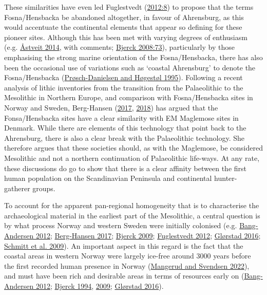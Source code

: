 \documentclass[
  12pt,
  a4paper,
  oneside]{book}
\begin{document}
These similarities have even led Fuglestvedt (\protect\hyperlink{ref-fuglestvedt2012}{2012:8}) to propose that the terms Fosna/Hensbacka be abandoned altogether, in favour of Ahrensburg, as this would accentuate the continental elements that appear so defining for these pioneer sites. Although this has been met with varying degrees of enthusiasm (e.g. \protect\hyperlink{ref-uxe5stveit2014}{Åstveit 2014}, with comments; \protect\hyperlink{ref-bjerck2008}{Bjerck 2008:73}), particularly by those emphasising the strong marine orientation of the Fosna/Hensbacka, there has also been the occasional use of variations such as `coastal Ahrensburg' to denote the Fosna/Hensbacka (\protect\hyperlink{ref-pruxf8sch-danielsen1995}{Prøsch-Danielsen and Høgestøl 1995}). Following a recent analysis of lithic inventories from the transition from the Palaeolithic to the Mesolithic in Northern Europe, and comparison with Fosna/Hensbacka sites in Norway and Sweden, Berg-Hansen (\protect\hyperlink{ref-berg-hansen2017}{2017}, \protect\hyperlink{ref-berg-hansen2018}{2018}) has argued that the Fonsa/Hensbacka sites have a clear similarity with EM Maglemose sites in Denmark. While there are elements of this technology that point back to the Ahrensburg, there is also a clear break with the Palaeolithic technology. She therefore argues that these societies should, as with the Maglemose, be considered Mesolithic and not a northern continuation of Palaeolithic life-ways. At any rate, these discussions do go to show that there is a clear affinity between the first human population on the Scandinavian Peninsula and continental hunter-gatherer groups.

To account for the apparent pan-regional homogeneity that is to characterise the archaeological material in the earliest part of the Mesolithic, a central question is by what process Norway and western Sweden were initially colonised (e.g. \protect\hyperlink{ref-bang-andersen2012}{Bang-Andersen 2012}; \protect\hyperlink{ref-berg-hansen2017}{Berg-Hansen 2017}; \protect\hyperlink{ref-bjerck2009}{Bjerck 2009}; \protect\hyperlink{ref-fuglestvedt2012}{Fuglestvedt 2012}; \protect\hyperlink{ref-glorstad2016}{Glørstad 2016}; \protect\hyperlink{ref-schmitt2009}{Schmitt et al. 2009}). An important aspect in this regard is the fact that the coastal areas in western Norway were largely ice-free around 3000 years before the first recorded human presence in Norway (\protect\hyperlink{ref-mangerud2022}{Mangerud and Svendsen 2022}), and must have been rich and desirable areas in terms of resources early on (\protect\hyperlink{ref-bang-andersen2012}{Bang-Andersen 2012}; \protect\hyperlink{ref-bjerck1994}{Bjerck 1994}, \protect\hyperlink{ref-bjerck2009}{2009}; \protect\hyperlink{ref-glorstad2016}{Glørstad 2016}).
\end{document}

